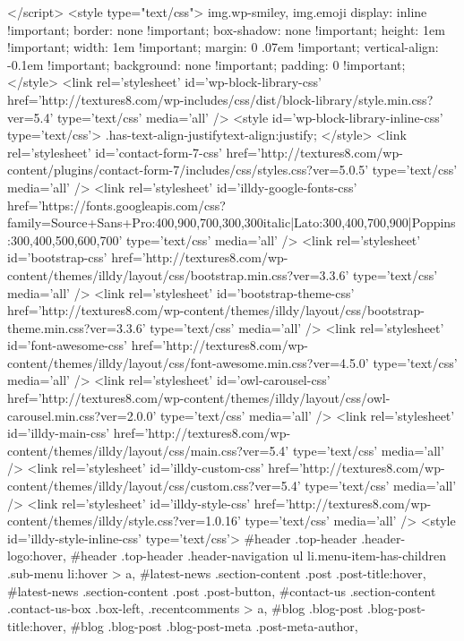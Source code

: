 		</script>
		<style type="text/css">
img.wp-smiley,
img.emoji {
	display: inline !important;
	border: none !important;
	box-shadow: none !important;
	height: 1em !important;
	width: 1em !important;
	margin: 0 .07em !important;
	vertical-align: -0.1em !important;
	background: none !important;
	padding: 0 !important;
}
</style>
	<link rel='stylesheet' id='wp-block-library-css'  href='http://textures8.com/wp-includes/css/dist/block-library/style.min.css?ver=5.4' type='text/css' media='all' />
<style id='wp-block-library-inline-css' type='text/css'>
.has-text-align-justify{text-align:justify;}
</style>
<link rel='stylesheet' id='contact-form-7-css'  href='http://textures8.com/wp-content/plugins/contact-form-7/includes/css/styles.css?ver=5.0.5' type='text/css' media='all' />
<link rel='stylesheet' id='illdy-google-fonts-css'  href='https://fonts.googleapis.com/css?family=Source+Sans+Pro:400,900,700,300,300italic|Lato:300,400,700,900|Poppins:300,400,500,600,700' type='text/css' media='all' />
<link rel='stylesheet' id='bootstrap-css'  href='http://textures8.com/wp-content/themes/illdy/layout/css/bootstrap.min.css?ver=3.3.6' type='text/css' media='all' />
<link rel='stylesheet' id='bootstrap-theme-css'  href='http://textures8.com/wp-content/themes/illdy/layout/css/bootstrap-theme.min.css?ver=3.3.6' type='text/css' media='all' />
<link rel='stylesheet' id='font-awesome-css'  href='http://textures8.com/wp-content/themes/illdy/layout/css/font-awesome.min.css?ver=4.5.0' type='text/css' media='all' />
<link rel='stylesheet' id='owl-carousel-css'  href='http://textures8.com/wp-content/themes/illdy/layout/css/owl-carousel.min.css?ver=2.0.0' type='text/css' media='all' />
<link rel='stylesheet' id='illdy-main-css'  href='http://textures8.com/wp-content/themes/illdy/layout/css/main.css?ver=5.4' type='text/css' media='all' />
<link rel='stylesheet' id='illdy-custom-css'  href='http://textures8.com/wp-content/themes/illdy/layout/css/custom.css?ver=5.4' type='text/css' media='all' />
<link rel='stylesheet' id='illdy-style-css'  href='http://textures8.com/wp-content/themes/illdy/style.css?ver=1.0.16' type='text/css' media='all' />
<style id='illdy-style-inline-css' type='text/css'>
#header .top-header .header-logo:hover,
#header .top-header .header-navigation ul li.menu-item-has-children .sub-menu li:hover > a,
#latest-news .section-content .post .post-title:hover,
#latest-news .section-content .post .post-button,
#contact-us .section-content .contact-us-box .box-left,
.recentcomments > a,
#blog .blog-post .blog-post-title:hover,
#blog .blog-post .blog-post-meta .post-meta-author,
